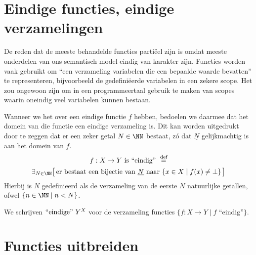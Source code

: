 \section{Eindige functies, eindige verzamelingen}

De reden dat de meeste behandelde functies partiëel zijn is omdat meeste onderdelen van ons semantisch model eindig van karakter zijn. Functies worden vaak gebruikt om “een verzameling variabelen die een bepaalde waarde bevatten” te representeren, bijvoorbeeld de gedefiniëerde variabelen in een zekere scope. Het zou ongewoon zijn om in een programmeertaal gebruik te maken van scopes waarin oneindig veel variabelen kunnen bestaan.

Wanneer we het over een eindige functie $f$ hebben, bedoelen we daarmee dat het domein van die functie een eindige verzameling is. Dit kan worden uitgedrukt door te zeggen dat er een zeker getal $N \in \NN$ bestaat, zó dat $\underline{N}$ gelijkmachtig is aan het domein van $f$.
\begin{multline*}
  f : X \to Y \text{ is “eindig” } \DEF \\
  \exists_{N \in \NN} \surr{ \text{er bestaat een bijectie van $\underline{N}$ naar } \{ x \in X \mid f(x) \neq \bot \} }
\end{multline*}
Hierbij is $\underline{N}$ gedefinieerd als de verzameling van de eerste $N$ natuurlijke getallen, ofwel $\{n \in \NN \mid n < N\}$.

We schrijven $\FiniteFunctions{Y}{X}$ voor de verzameling functies $\{f : X \to Y \mid f \text{ “eindig”} \}$.

\section{Functies uitbreiden}
\label{sec:uitbreiden}

